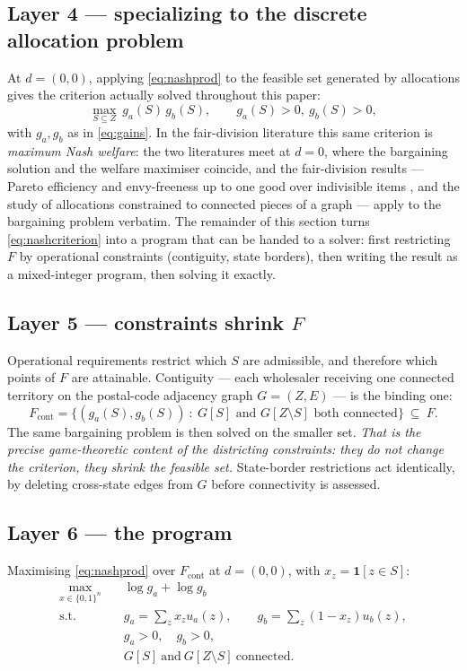 \documentclass[11pt]{article}
\theoremstyle{remark}\newtheorem*{remark}{Remark}
\begin{document}
\subsection{Layer 4 --- specializing to the discrete allocation problem}
At $d=(0,0)$, applying \eqref{eq:nashprod} to the feasible set generated by allocations
gives the criterion actually solved throughout this paper:
\begin{equation}\label{eq:nashcriterion}
\max_{S\subseteq Z}\ g_a(S)\,g_b(S),\qquad g_a(S)>0,\ g_b(S)>0,
\end{equation}
with $g_a,g_b$ as in \eqref{eq:gains}. In the fair-division literature this same
criterion is \emph{maximum Nash welfare}: the two literatures meet at $d=0$, where the
bargaining solution and the welfare maximiser coincide, and the fair-division results ---
Pareto efficiency and envy-freeness up to one good over indivisible items
\citep{caragiannis2019}, and the study of allocations constrained to connected pieces of
a graph \citep{bouveret2017} --- apply to the bargaining problem verbatim. The remainder
of this section turns \eqref{eq:nashcriterion} into a program that can be handed to a
solver: first restricting $F$ by operational constraints (contiguity, state borders),
then writing the result as a mixed-integer program, then solving it exactly.

\subsection{Layer 5 --- constraints shrink $F$}
Operational requirements restrict which $S$ are admissible, and therefore which points of
$F$ are attainable. Contiguity --- each wholesaler receiving one connected territory on
the postal-code adjacency graph $G=(Z,E)$ --- is the binding one:
\begin{equation}
F_{\text{cont}}=\bigl\{(g_a(S),g_b(S))\ :\ G[S]\text{ and }G[Z\setminus S]\text{ both connected}\bigr\}\ \subseteq\ F .
\end{equation}
The same bargaining problem is then solved on the smaller set. \emph{That is the precise
game-theoretic content of the districting constraints: they do not change the criterion,
they shrink the feasible set.} State-border restrictions act identically, by deleting
cross-state edges from $G$ before connectivity is assessed.

\subsection{Layer 6 --- the program}
Maximising \eqref{eq:nashprod} over $F_{\text{cont}}$ at $d=(0,0)$, with
$x_z=\mathbf{1}[z\in S]$:
\begin{align}
\max_{x\in\{0,1\}^n}\quad & \log g_a+\log g_b \label{eq:obj}\\
\text{s.t.}\quad
& g_a=\sum_z x_z u_a(z), \qquad g_b=\sum_z (1-x_z)u_b(z), \label{eq:lin}\\
& g_a>0,\quad g_b>0, \label{eq:feas}\\
& G[S]\ \text{and}\ G[Z\setminus S]\ \text{connected}. \label{eq:conn}
\end{align}
\end{document}
